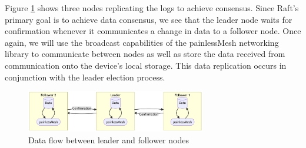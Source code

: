 Figure \ref{fig:data_flow} shows three nodes replicating the logs to achieve consensus. Since Raft's primary goal is to achieve data consensus, we see that the leader node waits for confirmation whenever it communicates a change in data to a follower node. Once again, we will use the broadcast capabilities of the painlessMesh networking library to communicate between nodes as well as store the data received from communication onto the device's local storage. This data replication occurs in conjunction with the leader election process.

\begin{figure}[H]
    \centering
    \includegraphics[width=0.7\textwidth]{final-proposal/images/final_design_data.png}
    \caption{Data flow between leader and follower nodes}
    \label{fig:data_flow}
    


  
\end{figure}




 
 